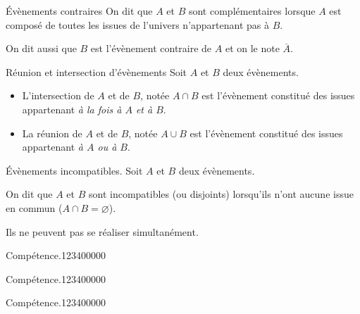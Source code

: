 \begin{pageCours}
\begin{DefT}{Évènements contraires}
On dit que $A$ et $B$ sont complémentaires lorsque $A$ est composé de toutes les issues de l'univers n'appartenant pas à $B$.

On dit aussi que $B$ est l'évènement contraire de $A$ et on le note $\overline{A}$.
\end{DefT}

\begin{DefT}{Réunion et intersection d'évènements}
Soit $A$ et $B$ deux évènements.
\begin{itemize}
\item L'intersection de $A$ et de $B$, notée $A\cap B$ est l'évènement constitué des issues appartenant \textit{à la fois à $A$ et à $B$}.
\item La réunion de $A$ et de $B$, notée $A\cup B$ est  l'évènement constitué des issues appartenant \textit{à $A$ ou à $B$}.
\end{itemize}
\end{DefT}

\begin{DefT}{Évènements incompatibles.}
Soit $A$ et $B$ deux évènements.

On dit que $A$ et $B$ sont incompatibles (ou disjoints) lorsqu'ils n'ont aucune issue en commun ($A\cap B=\varnothing$).

Ils ne peuvent pas se réaliser simultanément.
\end{DefT}

\end{pageCours} %


\begin{pageAD}  %
\restoregeometry %


\begin{ExoCad}{Compétence.}{1234}{0}{0}{0}{0}{0}

\end{ExoCad}


\begin{ExoCad}{Compétence.}{1234}{0}{0}{0}{0}{0}

\end{ExoCad}


\begin{ExoCad}{Compétence.}{1234}{0}{0}{0}{0}{0}

\end{ExoCad}
 
\end{pageAD} %

